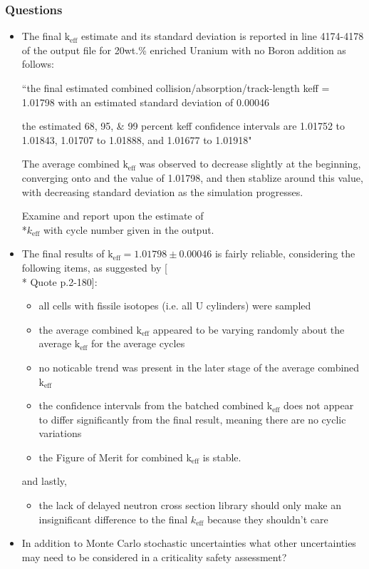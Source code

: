 \documentclass[a4paper, 12pt]{article}
\begin{document}
\subsubsection{Questions}
\begin{itemize}
	\item The final $\text{k}_{\text{eff}}$ estimate and its standard deviation is reported in line 4174-4178 of the output file for 20wt.\% enriched Uranium with no Boron addition as follows:
	
	``the final estimated combined collision/absorption/track-length keff = 1.01798 with an estimated standard deviation of 0.00046

 	the estimated 68, 95, \& 99 percent keff confidence intervals are 1.01752 to 1.01843, 1.01707 to 1.01888, and 1.01677 to 1.01918"

 	The average combined $\text{k}_{\text{eff}}$ was observed to decrease slightly at the beginning, converging onto and the value of 1.01798, and then stablize around this value, with decreasing standard deviation as the simulation progresses.

	Examine and report upon the estimate of \\*$k_{\text{eff}}$ with cycle number given in the output.
	\item The final results of $\text{k}_{\text{eff}} = 1.01798 \pm 0.00046$ is fairly reliable, considering the following items, as suggested by [\\* Quote p.2-180]:
	\begin{itemize}
		\item all cells with fissile isotopes (i.e. all U cylinders) were sampled
		\item the average combined $\text{k}_{\text{eff}}$ appeared to be varying randomly about the average $\text{k}_{\text{eff}}$ for the average cycles
		\item no noticable trend was present in the later stage of the average combined $\text{k}_{\text{eff}}$
		\item the confidence intervals from the batched combined $\text{k}_{\text{eff}}$ does not appear to differ significantly from the final result, meaning there are no cyclic variations
		\item the Figure of Merit for combined $\text{k}_{\text{eff}}$ is stable.
	\end{itemize}
	and lastly,
	\begin{itemize}
		\item the lack of delayed neutron cross section library should only make an insignificant difference to the final $k_{\text{eff}}$ because they shouldn't care
	\end{itemize}
	\item In addition to Monte Carlo stochastic uncertainties what other uncertainties may need to be considered in a criticality safety assessment?
\end{itemize}
\end{document}
